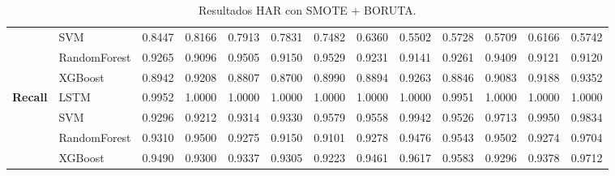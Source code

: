 \begin{table}[h]
\begin{adjustbox}{max width=15cm}
\begin{tabular}{|c|l|r|r|r|r|r|r|r|r|r|r|r|}
			& SVM &  0.8447 &  0.8166 &  0.7913 &  0.7831 &  0.7482 &  0.6360 &  0.5502 &  0.5728 &  0.5709 &  0.6166 &  0.5742 \\
			& RandomForest &  0.9265 &  0.9096 &  0.9505 &  0.9150 &  0.9529 &  0.9231 &  0.9141 &  0.9261 &  0.9409 &  0.9121 &  0.9120 \\
			& XGBoost &  0.8942 &  0.9208 &  0.8807 &  0.8700 &  0.8990 &  0.8894 &  0.9263 &  0.8846 &  0.9083 &  0.9188 &  0.9352 \\
			\hline
			\textbf{Recall} & LSTM &  0.9952 &  1.0000 &  1.0000 &  1.0000 &  1.0000 &  1.0000 &  1.0000 &  0.9951 &  1.0000 &  1.0000 &  1.0000 \\
			& SVM &  0.9296 &  0.9212 &  0.9314 &  0.9330 &  0.9579 &  0.9558 &  0.9942 &  0.9526 &  0.9713 &  0.9950 &  0.9834 \\
			& RandomForest &  0.9310 &  0.9500 &  0.9275 &  0.9150 &  0.9101 &  0.9278 &  0.9476 &  0.9543 &  0.9502 &  0.9274 &  0.9704 \\
			& XGBoost &  0.9490 &  0.9300 &  0.9337 &  0.9305 &  0.9223 &  0.9461 &  0.9617 &  0.9583 &  0.9296 &  0.9378 &  0.9712 \\
			\hline
		\end{tabular}
	\end{adjustbox}
	\caption{Resultados HAR con SMOTE + BORUTA.}
	\label{tab:HAR_SMOTE_BORUTA}
\end{table}
\newpage
